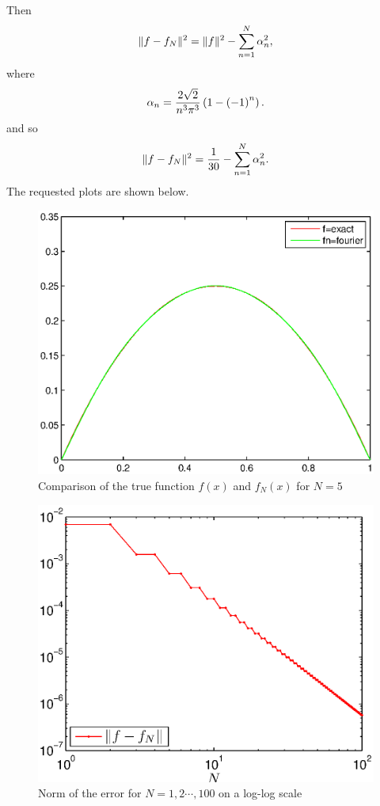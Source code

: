 \begin{solution}
\begin{enumerate}
\[\]
Then
\[
\|f-f_N\|^2 = \|f\|^2 - \sum_{n=1}^N \alpha_n^2,
\]
where
\[
\alpha_n={2 \sqrt{2} \over n^3 \pi^3} \left(1-\left(-1\right)^n\right).
\]
and so
\[
\|f-f_N\|^2 = \frac{1}{30} - \sum_{n=1}^N \alpha_n^2.
\]
The requested plots are shown below. 
\begin{figure}
\centering
\includegraphics[scale=0.9]{ffn}
\vspace{-.5cm}
\caption{Comparison of the true function $f(x)$ and $f_N(x)$ for $N = 5$}
\end{figure}

\begin{figure}
\centering
\includegraphics[scale=0.9]{ffnnorm}
\vspace{-.4cm}
\caption{Norm of the error for $N=1,2 \cdots,100$ on a log-log scale}
\end{figure}



\end{enumerate}
\end{solution}
